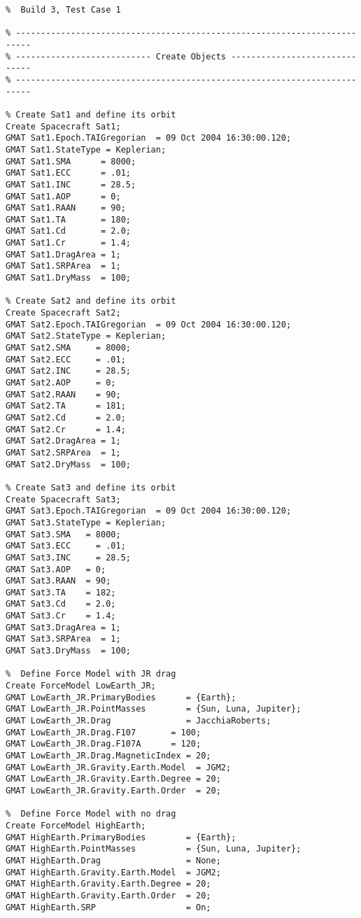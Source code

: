 \begin{Script}\begin{verbatim}
%  Build 3, Test Case 1

% -------------------------------------------------------------------------
% --------------------------- Create Objects ------------------------------
% -------------------------------------------------------------------------

% Create Sat1 and define its orbit
Create Spacecraft Sat1;
GMAT Sat1.Epoch.TAIGregorian  = 09 Oct 2004 16:30:00.120;
GMAT Sat1.StateType = Keplerian;
GMAT Sat1.SMA      = 8000;
GMAT Sat1.ECC      = .01;
GMAT Sat1.INC      = 28.5;
GMAT Sat1.AOP      = 0;
GMAT Sat1.RAAN     = 90;
GMAT Sat1.TA       = 180;
GMAT Sat1.Cd       = 2.0;
GMAT Sat1.Cr       = 1.4;
GMAT Sat1.DragArea = 1;
GMAT Sat1.SRPArea  = 1;
GMAT Sat1.DryMass  = 100;

% Create Sat2 and define its orbit
Create Spacecraft Sat2;
GMAT Sat2.Epoch.TAIGregorian  = 09 Oct 2004 16:30:00.120;
GMAT Sat2.StateType = Keplerian;
GMAT Sat2.SMA     = 8000;
GMAT Sat2.ECC     = .01;
GMAT Sat2.INC     = 28.5;
GMAT Sat2.AOP     = 0;
GMAT Sat2.RAAN    = 90;
GMAT Sat2.TA      = 181;
GMAT Sat2.Cd      = 2.0;
GMAT Sat2.Cr      = 1.4;
GMAT Sat2.DragArea = 1;
GMAT Sat2.SRPArea  = 1;
GMAT Sat2.DryMass  = 100;

% Create Sat3 and define its orbit
Create Spacecraft Sat3;
GMAT Sat3.Epoch.TAIGregorian  = 09 Oct 2004 16:30:00.120;
GMAT Sat3.StateType = Keplerian;
GMAT Sat3.SMA   = 8000;
GMAT Sat3.ECC     = .01;
GMAT Sat3.INC     = 28.5;
GMAT Sat3.AOP   = 0;
GMAT Sat3.RAAN  = 90;
GMAT Sat3.TA    = 182;
GMAT Sat3.Cd    = 2.0;
GMAT Sat3.Cr    = 1.4;
GMAT Sat3.DragArea = 1;
GMAT Sat3.SRPArea  = 1;
GMAT Sat3.DryMass  = 100;

%  Define Force Model with JR drag
Create ForceModel LowEarth_JR;
GMAT LowEarth_JR.PrimaryBodies      = {Earth};
GMAT LowEarth_JR.PointMasses        = {Sun, Luna, Jupiter};
GMAT LowEarth_JR.Drag               = JacchiaRoberts;
GMAT LowEarth_JR.Drag.F107       = 100;
GMAT LowEarth_JR.Drag.F107A      = 120;
GMAT LowEarth_JR.Drag.MagneticIndex = 20;
GMAT LowEarth_JR.Gravity.Earth.Model  = JGM2;
GMAT LowEarth_JR.Gravity.Earth.Degree = 20;
GMAT LowEarth_JR.Gravity.Earth.Order  = 20;

%  Define Force Model with no drag
Create ForceModel HighEarth;
GMAT HighEarth.PrimaryBodies        = {Earth};
GMAT HighEarth.PointMasses          = {Sun, Luna, Jupiter};
GMAT HighEarth.Drag                 = None;
GMAT HighEarth.Gravity.Earth.Model  = JGM2;
GMAT HighEarth.Gravity.Earth.Degree = 20;
GMAT HighEarth.Gravity.Earth.Order  = 20;
GMAT HighEarth.SRP                  = On;


\end{verbatim}
\end{Script}
